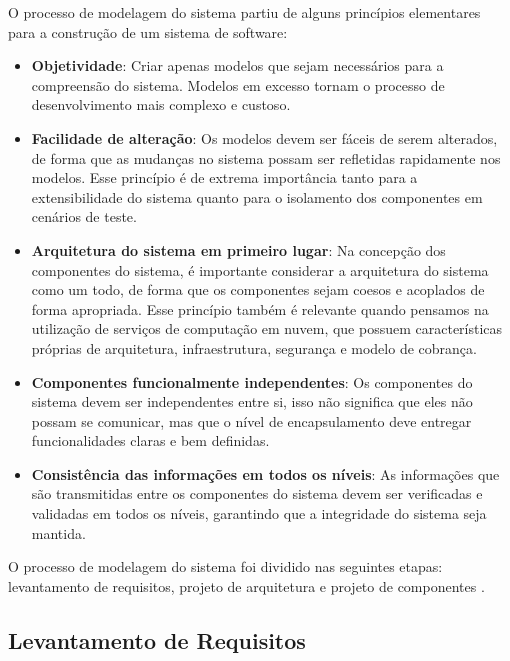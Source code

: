 O processo de modelagem do sistema partiu de alguns princípios elementares para a construção de um sistema de software: 

\begin{itemize}
    \item \textbf{Objetividade}: Criar apenas modelos que sejam necessários para a compreensão do sistema. Modelos em excesso tornam o processo de desenvolvimento mais complexo e custoso.

    \item \textbf{Facilidade de alteração}: Os modelos devem ser fáceis de serem alterados, de forma que as mudanças no sistema possam ser refletidas rapidamente nos modelos. Esse princípio é de extrema importância tanto para a extensibilidade do sistema quanto para o isolamento dos componentes em cenários de teste.

    \item \textbf{Arquitetura do sistema em primeiro lugar}: Na concepção dos componentes do sistema, é importante considerar a arquitetura do sistema como um todo, de forma que os componentes sejam coesos e acoplados de forma apropriada. Esse princípio também é relevante quando pensamos na utilização de serviços de computação em nuvem, que possuem características próprias de arquitetura, infraestrutura, segurança e modelo de cobrança.

    \item \textbf{Componentes funcionalmente independentes}: Os componentes do sistema devem ser independentes entre si, isso não significa que eles não possam se comunicar, mas que o nível de encapsulamento deve entregar funcionalidades claras e bem definidas.

    \item \textbf{Consistência das informações em todos os níveis}: As informações que são transmitidas entre os componentes do sistema devem ser verificadas e validadas em todos os níveis, garantindo que a integridade do sistema seja mantida.

\end{itemize}

O processo de modelagem do sistema foi dividido nas seguintes etapas: levantamento de requisitos, projeto de arquitetura e projeto de componentes \citep{pressman2016}.

\subsection{Levantamento de Requisitos}
\label{subsec:levantamentoDeRequisitos}

